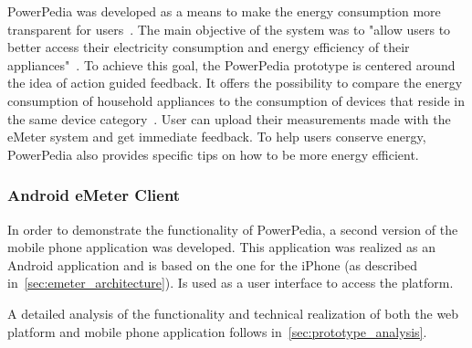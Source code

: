 PowerPedia was developed as a means to make the energy consumption more transparent for users~\cite{merklepp}. The main objective of the system was to "allow users to better access their electricity consumption and energy efficiency of their appliances"~\cite{weiss:inprocPUC:2012}. To achieve this goal, the PowerPedia prototype is centered around the idea of action guided feedback. It offers the possibility to compare the energy consumption of household appliances to the consumption of devices that reside in the same device category~\cite{merklepp}. User can upload their measurements made with the eMeter system and get immediate feedback. To help users conserve energy, PowerPedia also provides specific tips on how to be more energy efficient.

\subsubsection{Android eMeter Client}
In order to demonstrate the functionality of PowerPedia, a second version of the mobile phone application was developed. This application was realized as an Android application and is based on the one for the iPhone (as described in~\ref{sec:emeter_architecture}). Is used as a user interface to access the platform.

A detailed analysis of the functionality and technical realization of both the web platform and mobile phone application follows in~\ref{sec:prototype_analysis}.